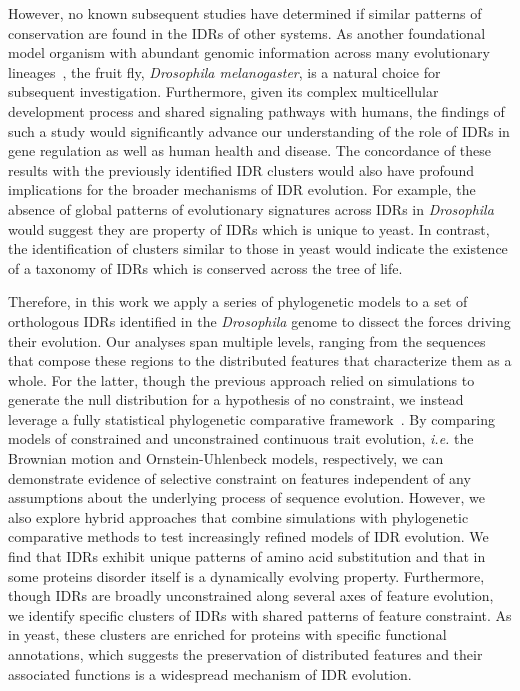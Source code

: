 However, no known subsequent studies have determined if similar patterns of conservation are found in the IDRs of other systems. As another foundational model organism with abundant genomic information across many evolutionary lineages~\cite{Yang2018, Miller2018, Kim2021, Gramates2022}, the fruit fly, \textit{Drosophila melanogaster}, is a natural choice for subsequent investigation. Furthermore, given its complex multicellular development process and shared signaling pathways with humans, the findings of such a study would significantly advance our understanding of the role of IDRs in gene regulation as well as human health and disease. The concordance of these results with the previously identified IDR clusters would also have profound implications for the broader mechanisms of IDR evolution. For example, the absence of global patterns of evolutionary signatures across IDRs in \textit{Drosophila} would suggest they are property of IDRs which is unique to yeast. In contrast, the identification of clusters similar to those in yeast would indicate the existence of a taxonomy of IDRs which is conserved across the tree of life.

Therefore, in this work we apply a series of phylogenetic models to a set of orthologous IDRs identified in the \textit{Drosophila} genome to dissect the forces driving their evolution. Our analyses span multiple levels, ranging from the sequences that compose these regions to the distributed features that characterize them as a whole. For the latter, though the previous approach relied on simulations to generate the null distribution for a hypothesis of no constraint, we instead leverage a fully statistical phylogenetic comparative framework~\cite{Cornwell2017}. By comparing models of constrained and unconstrained continuous trait evolution, \textit{i.e.} the Brownian motion and Ornstein-Uhlenbeck models, respectively, we can demonstrate evidence of selective constraint on features independent of any assumptions about the underlying process of sequence evolution. However, we also explore hybrid approaches that combine simulations with phylogenetic comparative methods to test increasingly refined models of IDR evolution. We find that IDRs exhibit unique patterns of amino acid substitution and that in some proteins disorder itself is a dynamically evolving property. Furthermore, though IDRs are broadly unconstrained along several axes of feature evolution, we identify specific clusters of IDRs with shared patterns of feature constraint. As in yeast, these clusters are enriched for proteins with specific functional annotations, which suggests the preservation of distributed features and their associated functions is a widespread mechanism of IDR evolution.

